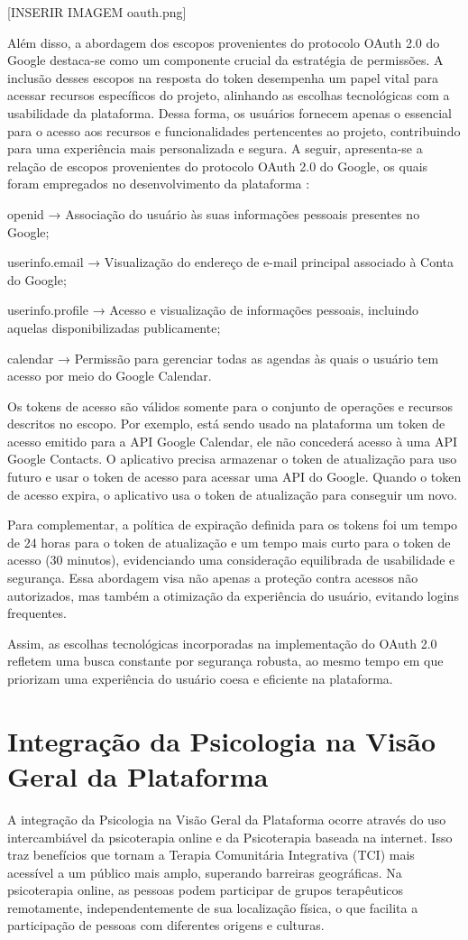 [INSERIR IMAGEM oauth.png]

Além disso, a abordagem dos escopos provenientes do protocolo OAuth 2.0 do Google destaca-se como um componente crucial da estratégia de permissões. A inclusão desses escopos na resposta do token desempenha um papel vital para acessar recursos específicos do projeto, alinhando as escolhas tecnológicas com a usabilidade da plataforma. Dessa forma, os usuários fornecem apenas o essencial para o acesso aos recursos e funcionalidades pertencentes ao projeto, contribuindo para uma experiência mais personalizada e segura. A seguir, apresenta-se a relação de escopos provenientes do protocolo OAuth 2.0 do Google, os quais foram empregados no desenvolvimento da plataforma \cite{OAUTHSCOPES}:

openid → Associação do usuário às suas informações pessoais presentes no Google;

userinfo.email → Visualização do endereço de e-mail principal associado à Conta do Google;

userinfo.profile → Acesso e visualização de informações pessoais, incluindo aquelas disponibilizadas publicamente;

calendar → Permissão para gerenciar todas as agendas às quais o usuário tem acesso por meio do Google Calendar.

Os tokens de acesso são válidos somente para o conjunto de operações e recursos descritos no escopo. Por exemplo, está sendo usado na plataforma um token de acesso emitido para a API Google Calendar, ele não concederá acesso à uma API Google Contacts. O aplicativo precisa armazenar o token de atualização para uso futuro e usar o token de acesso para acessar uma API do Google. Quando o token de acesso expira, o aplicativo usa o token de atualização para conseguir um novo.

Para complementar, a política de expiração definida para os tokens foi um tempo de 24 horas para o token de atualização e um tempo mais curto para o token de acesso (30 minutos), evidenciando uma consideração equilibrada de usabilidade e segurança. Essa abordagem visa não apenas a proteção contra acessos não autorizados, mas também a otimização da experiência do usuário, evitando logins frequentes.

Assim, as escolhas tecnológicas incorporadas na implementação do OAuth 2.0 refletem uma busca constante por segurança robusta, ao mesmo tempo em que priorizam uma experiência do usuário coesa e eficiente na plataforma.


\chapter{Integração da Psicologia na Visão Geral da Plataforma}
A integração da Psicologia na Visão Geral da Plataforma ocorre através do uso intercambiável da psicoterapia online e da Psicoterapia baseada na internet. Isso traz benefícios que tornam a Terapia Comunitária Integrativa (TCI) mais acessível a um público mais amplo, superando barreiras geográficas. Na psicoterapia online, as pessoas podem participar de grupos terapêuticos remotamente, independentemente de sua localização física, o que facilita a participação de pessoas com diferentes origens e culturas.

